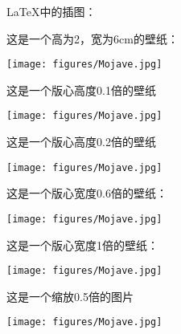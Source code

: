 \documentclass{ctexart}
\begin{document}
    \LaTeX 中的插图：

    这是一个高为2，宽为6cm的壁纸：

    \texttt{[image: figures/Mojave.jpg]}

    这是一个版心高度0.1倍的壁纸

    \texttt{[image: figures/Mojave.jpg]}

    这是一个版心高度0.2倍的壁纸

    \texttt{[image: figures/Mojave.jpg]}

    这是一个版心宽度0.6倍的壁纸：

    \texttt{[image: figures/Mojave.jpg]}

    这是一个版心宽度1倍的壁纸：

    \texttt{[image: figures/Mojave.jpg]}

    这是一个缩放0.5倍的图片

    \texttt{[image: figures/Mojave.jpg]}
\end{document}

